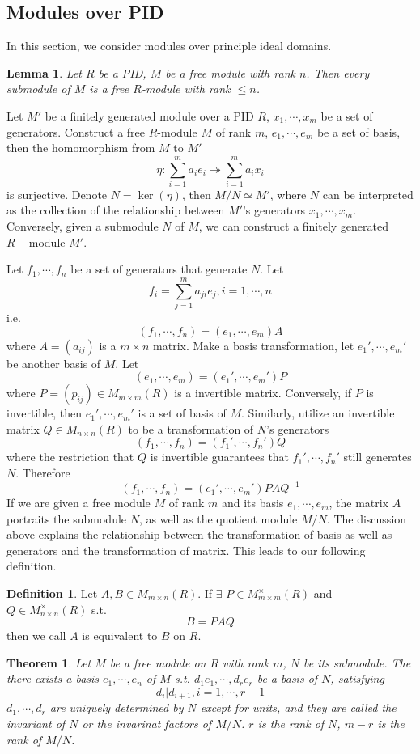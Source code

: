 \documentclass{book}
\newtheorem{theorem}{Theorem}[section]
\newtheorem{lemma}{Lemma}[section]
\theoremstyle{definition}
\newtheorem{definition}{Definition}[section]
\begin{document}
\subsection{Modules over PID}
In this section, we consider modules over principle ideal domains.\par
\begin{lemma}
Let $R$ be a PID, $M$ be a free module with rank $n$. Then every submodule of $M$ is a free $R$-module with rank $\le n$.
\end{lemma}
Let $M'$ be a finitely generated module over a PID $R$, $x_1,\cdots,x_m$ be a set of generators. Construct a free $R$-module $M$ of rank $m$, $e_1,\cdots,e_m$ be a set of basis, then the homomorphism from $M$ to $M'$
\[\eta : \sum_{i=1}^ma_ie_i\twoheadrightarrow \sum_{i=1}^ma_ix_i\]
is surjective. Denote $N=\ker (\eta)$, then $M/N\simeq M'$, where $N$ can be interpreted as the collection of the relationship between $M'$'s generators $x_1,\cdots,x_m$. Conversely, given a submodule $N$ of $M$, we can construct a finitely generated $R-$module $M'$. \par
Let $f_1,\cdots,f_n$ be a set of generators that generate $N$. Let 
\[f_i=\sum_{j=1}^ma_{ji}e_j,i=1,\cdots,n\]
i.e.\[(f_1,\cdots,f_n)=(e_1,\cdots,e_m)A\]
where $A=(a_{ij})$ is a $m\times n$ matrix. Make a basis transformation, let $e_1',\cdots,e_m'$ be another basis of $M$. Let
\[(e_1,\cdots,e_m)=(e_1',\cdots,e_m')P\]where $P=(p_{ij})\in M_{m\times m}(R)$ is a invertible matrix. Conversely, if $P$ is invertible, then $e_1',\cdots,e_m'$ is a set of basis of $M$. Similarly, utilize an invertible matrix $Q\in M_{n\times n}(R)$ to be a transformation of $N$'s generators\[(f_1,\cdots,f_n)=(f_1',\cdots,f_n')Q\]
where the restriction that $Q$ is invertible guarantees that $f_1',\cdots,f_n'$ still generates $N$. Therefore\[(f_1,\cdots,f_n)=(e_1',\cdots,e_m')PAQ^{-1}\]
If we are given a free module $M$ of rank $m$ and its basis $e_1,\cdots,e_m$, the matrix $A$ portraits the submodule $N$, as well as the quotient module $M/N$. The discussion above explains the relationship between the transformation of basis as well as generators and the transformation of matrix. This leads to our following definition.
\begin{definition}
Let $A,B\in M_{m\times n}(R)$. If $\exists$ $P\in M_{m\times m}^{\times}(R)$ and $Q\in M_{n\times n}^{\times}(R)$ s.t. \[B=PAQ\] then we call $A$ is equivalent to $B$ on $R$.
\end{definition}
\begin{theorem}
Let $M$ be a free module on $R$ with rank $m$, $N$ be its submodule. The there exists a basis $e_1,\cdots,e_n$ of $M$ s.t. $d_1e_1,\cdots,d_re_r$ be a basis of $N$, satisfying \[d_i|d_{i+1},i=1,\cdots,r-1\]$d_1,\cdots,d_r$ are uniquely determined by $N$ except for units, and they are called the invariant of $N$ or the invarinat factors of $M/N$. $r$ is the rank of $N$, $m-r$ is the rank of $M/N$.
\end{theorem}
\end{document}
